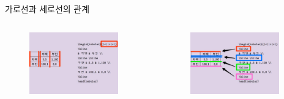 \documentclass{beamer}
\begin{document}
\begin{frame}

\begin{block}{가로선과 세로선의 관계}
\begin{columns}
\begin{column}{0.5\textwidth}
\begin{figure}[!h]
\begin{center}
\includegraphics[width=0.9\textwidth]{table001}
\end{center}
\end{figure}

\end{column}
\begin{column}{0.5\textwidth}
\begin{figure}[!h]
\begin{center}
\includegraphics[width=0.9\textwidth]{table002}
\end{center}
\end{figure}

\end{column}
\end{columns}
\end{block}
\end{frame}
\end{document}
